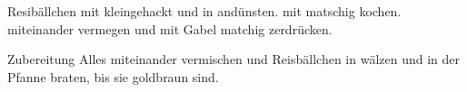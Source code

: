 \begin{recipe}{Resibällchen}
	 mit
	 kleingehackt und in 
	 andünsten.
	 mit 
	 matschig kochen.
	 miteinander vermegen und mit Gabel matchig zerdrücken. 
	\item[Zubereitung] Alles miteinander vermischen und Reisbällchen in 
	 wälzen und in der Pfanne braten, bis sie goldbraun sind.
\end{recipe}
